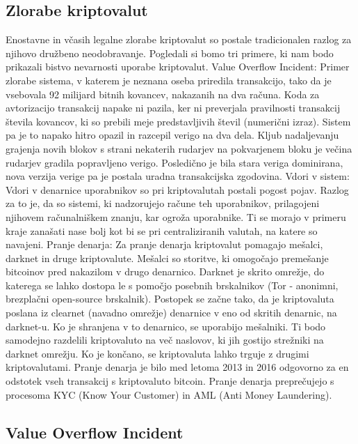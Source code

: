 \documentclass[letterpaper, titlepage, freqn]{article}
\begin{document}
\subsection{Zlorabe kriptovalut}

Enostavne in včasih legalne zlorabe kriptovalut so postale tradicionalen razlog za njihovo družbeno neodobravanje. Pogledali si bomo tri primere, ki nam bodo prikazali bistvo nevarnosti uporabe kriptovalut.
Value Overflow Incident: Primer zlorabe sistema, v katerem je neznana oseba priredila transakcijo, tako da je vsebovala 92 milijard bitnih kovancev, nakazanih na dva računa. Koda za avtorizacijo transakcij napake ni pazila, ker ni preverjala pravilnosti transakcij števila kovancov, ki so prebili meje predstavljivih števil (numerični izraz). Sistem pa je to napako hitro opazil in razcepil verigo na dva dela. Kljub nadaljevanju grajenja novih blokov s strani nekaterih rudarjev na pokvarjenem bloku je večina rudarjev gradila popravljeno verigo. Posledično je bila stara veriga dominirana, nova verzija verige pa je postala uradna transakcijska zgodovina.
Vdori v sistem: Vdori v denarnice uporabnikov so pri kriptovalutah postali pogost pojav. Razlog za to je, da so sistemi, ki nadzorujejo račune teh uporabnikov, prilagojeni njihovem računalniškem znanju, kar ogroža uporabnike. Ti se morajo v primeru kraje zanašati nase bolj kot bi se pri centraliziranih valutah, na katere so navajeni.
Pranje denarja: Za pranje denarja kriptovalut pomagajo mešalci, darknet in druge kriptovalute. Mešalci so storitve, ki omogočajo premešanje bitcoinov pred nakazilom v drugo denarnico. Darknet je skrito omrežje, do katerega se lahko dostopa le s pomočjo posebnih brskalnikov (Tor - anonimni, brezplačni open-source brskalnik). Postopek se začne tako, da je kriptovaluta poslana iz clearnet (navadno omrežje) denarnice v eno od skritih denarnic, na darknet-u. Ko je shranjena v to denarnico, se uporabijo mešalniki. Ti bodo samodejno razdelili kriptovaluto na več naslovov, ki jih gostijo strežniki na darknet omrežju. Ko je končano, se kriptovaluta lahko trguje z drugimi kriptovalutami.
Pranje denarja je bilo med letoma 2013 in 2016 odgovorno za en odstotek vseh transakcij s kriptovaluto bitcoin. Pranje denarja preprečujejo s procesoma KYC (Know Your Customer) in AML (Anti Money Laundering).\\

\subsection{Value Overflow Incident}
\end{document}
